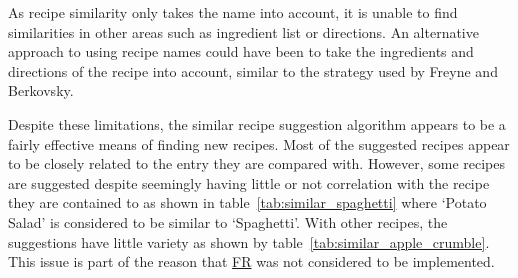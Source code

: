 As recipe similarity only takes the name into account, it is unable to find similarities
in other areas such as ingredient list or directions. An alternative approach to using
recipe names could have been to take the ingredients and directions of the recipe into account,
similar to the strategy used by Freyne and Berkovsky.~\cite{freyne_intelligent_2010}

Despite these limitations, the similar recipe suggestion algorithm appears to be a fairly effective
means of finding new recipes. Most of the suggested recipes appear to be closely related to the entry they are
compared with. However, some recipes are suggested despite seemingly having little or not correlation with the
recipe they are contained to as shown in table~\ref{tab:similar_spaghetti} where \enquote*{Potato Salad} is considered
to be similar to \enquote*{Spaghetti}. With other recipes, the suggestions have little variety as shown by
table~\ref{tab:similar_apple_crumble}. This issue is part of the reason that
\hyperref[req:too_similar]{FR} was not considered to be implemented.

\begin{table}[p]
    \centering
    \caption{\label{tab:similar}Similar recipes for \enquote*{Spaghetti} and \enquote*{Apple Crumble}. Most results are omitted for brevity.}
    \quad
\end{table}

